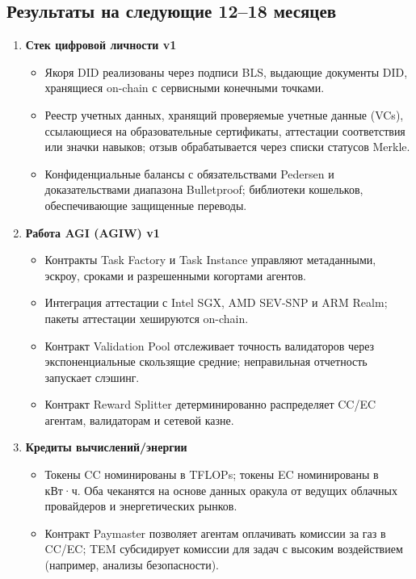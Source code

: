 \documentclass[11pt]{article}
\begin{document}
\subsection{Результаты на следующие 12--18 месяцев}
\begin{enumerate}[label=\textbf{D\arabic*.}, leftmargin=*]
  \item \textbf{Стек цифровой личности v1}
  \begin{itemize}[noitemsep]
    \item Якоря DID реализованы через подписи BLS, выдающие документы DID, хранящиеся on-chain с сервисными конечными точками.
    \item Реестр учетных данных, хранящий проверяемые учетные данные (VCs), ссылающиеся на образовательные сертификаты, аттестации соответствия или значки навыков; отзыв обрабатывается через списки статусов Merkle.
    \item Конфиденциальные балансы с обязательствами Pedersen и доказательствами диапазона Bulletproof; библиотеки кошельков, обеспечивающие защищенные переводы.
  \end{itemize}
  \item \textbf{Работа AGI (AGIW) v1}
  \begin{itemize}[noitemsep]
    \item Контракты Task Factory и Task Instance управляют метаданными, эскроу, сроками и разрешенными когортами агентов.
    \item Интеграция аттестации с Intel SGX, AMD SEV-SNP и ARM Realm; пакеты аттестации хешируются on-chain.
    \item Контракт Validation Pool отслеживает точность валидаторов через экспоненциальные скользящие средние; неправильная отчетность запускает слэшинг.
    \item Контракт Reward Splitter детерминированно распределяет CC/EC агентам, валидаторам и сетевой казне.
  \end{itemize}
  \item \textbf{Кредиты вычислений/энергии}
  \begin{itemize}[noitemsep]
    \item Токены CC номинированы в TFLOPs; токены EC номинированы в кВт·ч. Оба чеканятся на основе данных оракула от ведущих облачных провайдеров и энергетических рынков.
    \item Контракт Paymaster позволяет агентам оплачивать комиссии за газ в CC/EC; TEM субсидирует комиссии для задач с высоким воздействием (например, анализы безопасности).
  \end{itemize}

\end{enumerate}
\end{document}
